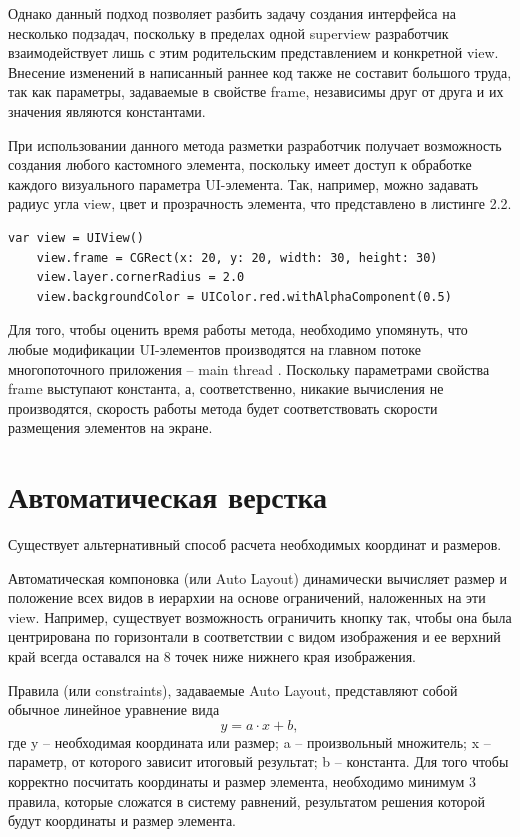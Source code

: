 Однако данный подход позволяет разбить задачу создания интерфейса на несколько подзадач, поскольку в пределах одной superview разработчик взаимодействует лишь с этим родительским представлением и конкретной view. Внесение изменений в написанный раннее код также не составит большого труда, так как параметры, задаваемые в свойстве frame, независимы друг от друга и их значения являются константами.

При использовании данного метода разметки разработчик получает возможность создания любого кастомного элемента, поскольку имеет доступ к обработке каждого визуального параметра UI-элемента. Так, например, можно задавать радиус угла view, цвет и прозрачность элемента, что представлено в листинге 2.2.

\begin{lstlisting}[caption=Задание параметров view]
	var view = UIView()
	view.frame = CGRect(x: 20, y: 20, width: 30, height: 30)
	view.layer.cornerRadius = 2.0
	view.backgroundColor = UIColor.red.withAlphaComponent(0.5)
\end{lstlisting}

Для того, чтобы оценить время работы метода, необходимо упомянуть, что любые модификации UI-элементов производятся на главном потоке многопоточного приложения -- main thread \cite{mainthread}. Поскольку параметрами свойства frame выступают константа, а, соответственно, никакие вычисления не производятся, скорость работы метода будет соответствовать скорости размещения элементов на экране. 


\section{Автоматическая верстка}

Существует альтернативный способ расчета необходимых координат и размеров. 

Автоматическая компоновка (или Auto Layout) \cite{autolayout} динамически вычисляет размер и положение всех видов в иерархии на основе ограничений, наложенных на эти view. Например, существует возможность ограничить кнопку так, чтобы она была центрирована по горизонтали в соответствии с видом изображения и ее верхний край всегда оставался на 8 точек ниже нижнего края изображения. 

Правила (или constraints), задаваемые Auto Layout, представляют собой обычное линейное уравнение вида \begin{equation}
	y = a \cdot x + b,
\end{equation}
где y – необходимая координата или размер; a – произвольный множитель; x – параметр, от которого зависит итоговый результат; b – константа. Для того чтобы корректно посчитать координаты и размер элемента, необходимо минимум 3 правила, которые сложатся в систему равнений, результатом решения которой будут координаты и размер элемента.

